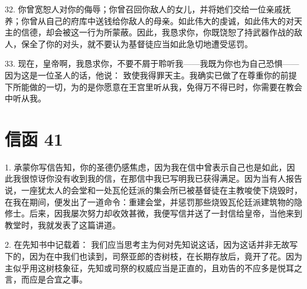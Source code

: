 32. 你曾宽恕人对你的侮辱；你曾召回你敌人的女儿，并将她们交给一位亲戚抚养；你曾从自己的府库中送钱给你敌人的母亲。如此伟大的虔诚，如此伟大的对天主的信德，却会被这一行为所蒙蔽。因此，我恳求你，你既饶恕了持武器作战的敌人，保全了你的对头，就不要认为基督徒应当如此急切地遭受惩罚。\par

33. 现在，皇帝啊，我恳求你，不要不屑于聆听我——我既为你也为自己恐惧——因为这是一位圣人的话，他说： 致使我得罪天主。我确实已做了在尊重你的前提下所能做的一切，为的是你愿意在王宫里听从我，免得万不得已时，你需要在教会中听从我。\par



\section{信函 41}

\par

\par

1. 承蒙你写信告知，你的圣德仍感焦虑，因为我在信中曾表示自己也是如此，因此我很惊讶你没有收到我的信，在那信中我已写明我已获得满足。因为当有人报告说，一座犹太人的会堂和一处瓦伦廷派的集会所已被基督徒在主教唆使下烧毁时，在我在期间，便发出了一道命令：重建会堂，并惩罚那些烧毁瓦伦廷派建筑物的隐修士。后来，因我屡次努力却收效甚微，我便写信并送了一封信给皇帝，当他来到教堂时，我就发表了这篇讲道。\par

2. 在先知书中记载着：  我们应当思考主为何对先知说这话，因为这话并非无故写下的，因为在中我们也读到，司祭亚郎的杏树枝，在长期存放后，竟开了花。因为主似乎用这树枝象征，先知或司祭的权威应当是正直的，且劝告的不应多是悦耳之言，而应是合宜之事。\par


